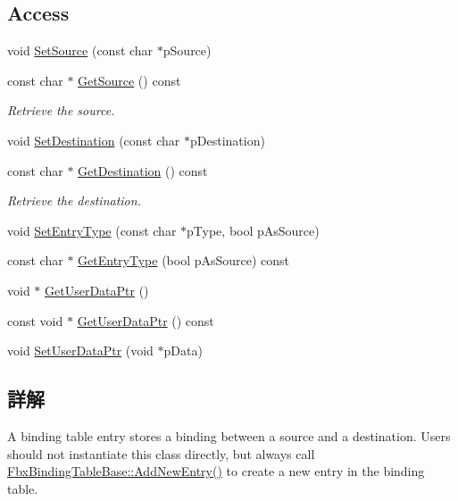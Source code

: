 \subsection*{Access}
\begin{DoxyCompactItemize}
\item 
void \hyperlink{class_fbx_binding_table_entry_abd6159bc2bfa28f28a5b5bd0a5e63c97}{Set\+Source} (const char $\ast$p\+Source)
\item 
const char $\ast$ \hyperlink{class_fbx_binding_table_entry_a0c5a62a50a5fbc5408ab3ec1af16518f}{Get\+Source} () const
\begin{DoxyCompactList}\small\item\em Retrieve the source. \end{DoxyCompactList}\item 
void \hyperlink{class_fbx_binding_table_entry_aaa49a62bd197febfb6052f3efa50eaf3}{Set\+Destination} (const char $\ast$p\+Destination)
\item 
const char $\ast$ \hyperlink{class_fbx_binding_table_entry_acee5bfe3f994725cca8670d2974b654a}{Get\+Destination} () const
\begin{DoxyCompactList}\small\item\em Retrieve the destination. \end{DoxyCompactList}\item 
void \hyperlink{class_fbx_binding_table_entry_a9e54bf1bb2bd0bcca05b7b6a057b0b8a}{Set\+Entry\+Type} (const char $\ast$p\+Type, bool p\+As\+Source)
\item 
const char $\ast$ \hyperlink{class_fbx_binding_table_entry_a9c116ecffcff4117ff1d3c69cf414b70}{Get\+Entry\+Type} (bool p\+As\+Source) const
\item 
void $\ast$ \hyperlink{class_fbx_binding_table_entry_a108bed4ff64375a63667fb20eb24ec8d}{Get\+User\+Data\+Ptr} ()
\item 
const void $\ast$ \hyperlink{class_fbx_binding_table_entry_aa9f5f5064caf0f961464d2555e3336ba}{Get\+User\+Data\+Ptr} () const
\item 
void \hyperlink{class_fbx_binding_table_entry_aea364cf8ef84414bf9524636e8407498}{Set\+User\+Data\+Ptr} (void $\ast$p\+Data)
\end{DoxyCompactItemize}


\subsection{詳解}
A binding table entry stores a binding between a source and a destination. Users should not instantiate this class directly, but always call \hyperlink{class_fbx_binding_table_base_a2ebf180e80538abf0e6512a8ca30ee10}{Fbx\+Binding\+Table\+Base\+::\+Add\+New\+Entry()} to create a new entry in the binding table. 


